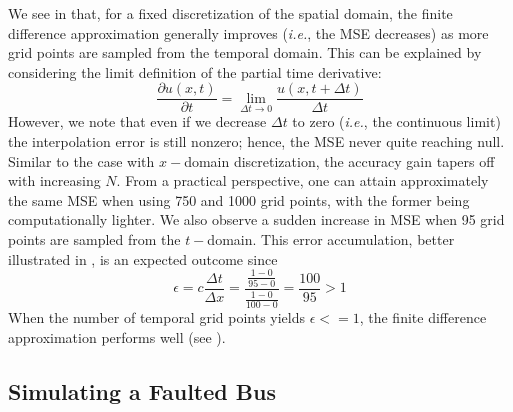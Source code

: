 \documentclass{article}
\begin{document}
We see in  that,
for a fixed discretization of the spatial domain,
the finite difference approximation generally improves
(\textit{i.e.}, the MSE decreases)
as more grid points are sampled from the temporal domain.
This can be explained by considering the limit definition of the partial time derivative:
\begin{equation}
	\label{eqn: Limit definition of the partial derivative wrt to t}
	\frac{\partial u \left(x,t\right)}{\partial t}
	=
	\lim_{\Delta t \longrightarrow 0}
	\frac{u \left(x, t + \Delta t\right)}{\Delta t}
\end{equation}
However, we note that even if we decrease $\Delta t$ to zero
(\textit{i.e.}, the continuous limit)
the interpolation error is still nonzero;
hence, the MSE never quite reaching null.
Similar to the case with $x-$domain discretization,
the accuracy gain tapers off with increasing $N$.
From a practical perspective, one can attain approximately the same MSE when using 750 and 1000 grid points,
with the former being computationally lighter.
We also observe a sudden increase in MSE when 95 grid points are sampled from the $t-$domain.
This error accumulation,
better illustrated in ,
is an expected outcome since
\begin{equation*}
	\epsilon = c \frac{\Delta t}{\Delta x}
	= \frac{\frac{1 - 0}{95 - 0}}{\frac{1 - 0}{100-0}}
	= \frac{100}{95}
	> 1
\end{equation*}
When the number of temporal grid points yields $\epsilon <= 1$,
the finite difference approximation performs well (see ).

\subsection{Simulating a Faulted Bus}
\label{subsec: Simulating a Faulted Bus}
\end{document}
